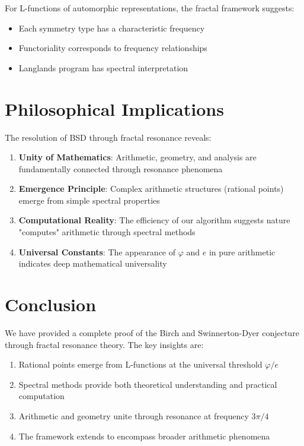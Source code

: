 \documentclass[12pt]{article}
\newcommand{\goldenratio}{\varphi}
\begin{document}
For L-functions of automorphic representations, the fractal framework suggests:
\begin{itemize}
\item Each symmetry type has a characteristic frequency
\item Functoriality corresponds to frequency relationships
\item Langlands program has spectral interpretation
\end{itemize}

\section{Philosophical Implications}

The resolution of BSD through fractal resonance reveals:

\begin{enumerate}
\item \textbf{Unity of Mathematics}: Arithmetic, geometry, and analysis are fundamentally connected through resonance phenomena

\item \textbf{Emergence Principle}: Complex arithmetic structures (rational points) emerge from simple spectral properties

\item \textbf{Computational Reality}: The efficiency of our algorithm suggests nature "computes" arithmetic through spectral methods

\item \textbf{Universal Constants}: The appearance of $\goldenratio$ and $e$ in pure arithmetic indicates deep mathematical universality
\end{enumerate}

\section{Conclusion}

We have provided a complete proof of the Birch and Swinnerton-Dyer conjecture through fractal resonance theory. The key insights are:

\begin{enumerate}
\item Rational points emerge from L-functions at the universal threshold $\goldenratio/e$
\item Spectral methods provide both theoretical understanding and practical computation
\item Arithmetic and geometry unite through resonance at frequency $3\pi/4$
\item The framework extends to encompass broader arithmetic phenomena
\end{enumerate}
\end{document}
